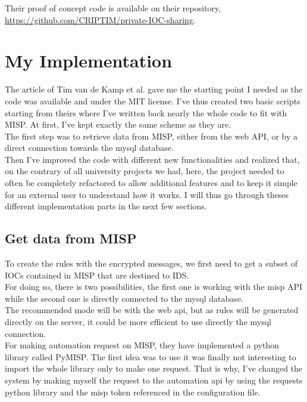 \documentclass{eplmastersthesis}
\begin{document}
Their proof of concept code is available on their repository, \url{https://github.com/CRIPTIM/private-IOC-sharing}. 


\section{My Implementation}
The article of Tim van de Kamp et al. gave me the starting point I needed as the code was available and under the MIT license. I've thus created two basic scripts starting from theirs where I've written back nearly the whole code to fit with MISP. At first, I've kept exactly the same scheme as they are.\\
The first step was to retrieve data from MISP, either from the web API, or by a direct connection towards the mysql database.\\
Then I've improved the code with different new functionalities and realized that, on the contrary of all university projects we had, here, the project needed to often be completely refactored to allow additional features and to keep it simple for an external user to understand how it works. I will thus go through theses different implementation parts in the next few sections.\\

\subsection{Get data from MISP}
To create the rules with the encrypted messages, we first need to get a subset of IOCs contained in MISP that are destined to IDS. \\
For doing so, there is two possibilities, the first one is working with the misp API while the second one is directly connected to the mysql database. \\
The recommended mode will be with the web api, but as rules will be generated directly on the server, it could be more efficient to use directly the mysql connection.\\

For making automation request on MISP, they have implemented a python library called PyMISP. The first idea was to use it was finally not interesting to import the whole library only to make one request. That is why, I've changed the system by making myself the request to the automation api by using the requests python library and the misp token referenced in the configuration file.\\
\end{document}

